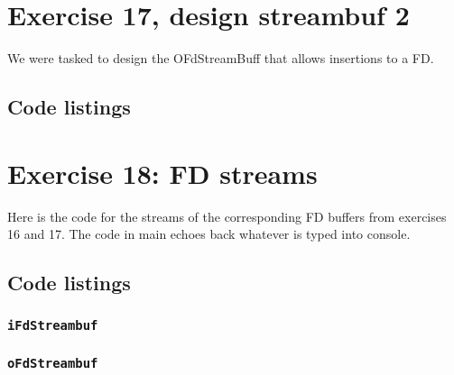 \documentclass[11pt]{article}
\begin{document}
\section*{Exercise 17, design streambuf 2}
We were tasked to design the OFdStreamBuff that allows insertions to a FD.

\subsection*{Code listings}











\section*{Exercise 18: FD streams}
Here is the code for the streams of the corresponding FD buffers from exercises 16 and 17.
The code in main echoes back whatever is typed into console.

\subsection*{Code listings}



\subsubsection*{\texttt{iFdStreambuf}}




\subsubsection*{\texttt{oFdStreambuf}}



\end{document}

